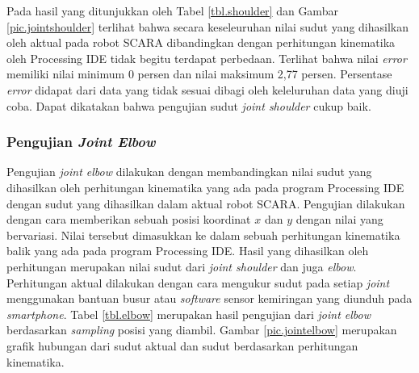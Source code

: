 Pada hasil yang ditunjukkan oleh Tabel \ref{tbl.shoulder} dan Gambar \ref{pic.jointshoulder} terlihat bahwa secara keseleuruhan nilai sudut yang dihasilkan oleh aktual pada robot SCARA dibandingkan dengan perhitungan kinematika oleh Processing IDE tidak begitu terdapat perbedaan. Terlihat bahwa nilai \textit{error}
 memiliki nilai minimum 0 persen dan nilai maksimum 2,77 persen. Persentase \textit{error} didapat dari data yang tidak sesuai dibagi oleh keleluruhan data yang diuji coba. Dapat dikatakan bahwa pengujian sudut \textit{joint shoulder} cukup baik.
 
 \subsubsection{Pengujian \textit{Joint Elbow}}
 Pengujian \textit{joint elbow} dilakukan dengan membandingkan nilai sudut yang dihasilkan oleh perhitungan kinematika yang ada pada program Processing IDE dengan sudut yang dihasilkan dalam aktual robot SCARA. Pengujian dilakukan dengan cara memberikan sebuah posisi koordinat $x$ dan $y$ dengan nilai yang bervariasi. Nilai tersebut dimasukkan ke dalam sebuah perhitungan kinematika balik yang ada pada program Processing IDE. Hasil yang dihasilkan oleh perhitungan merupakan nilai sudut dari \textit{joint shoulder} dan juga \textit{elbow}. Perhitungan aktual dilakukan dengan cara mengukur sudut pada setiap \textit{joint} menggunakan bantuan busur atau \textit{software} sensor kemiringan yang diunduh pada \textit{smartphone}. Tabel \ref{tbl.elbow} merupakan hasil pengujian dari \textit{joint elbow} berdasarkan \textit{sampling} posisi yang diambil. Gambar \ref{pic.jointelbow} merupakan grafik hubungan dari sudut aktual dan sudut berdasarkan perhitungan kinematika. 
